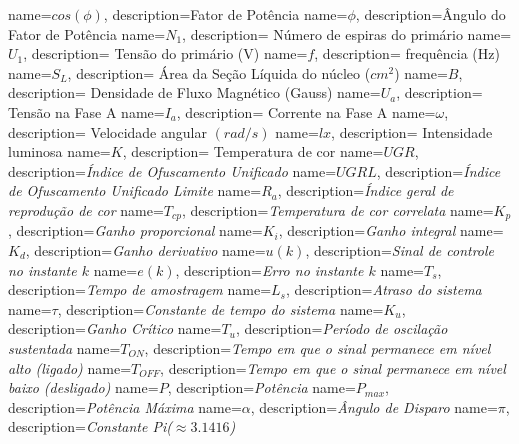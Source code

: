{
   name={$cos(\phi)$},
   description={Fator de Potência}
}
{
   name={$\phi$},
   description={Ângulo do Fator de Potência}
}
{
   name={$N_1$},
   description= Número de espiras do primário
}
{
   name={$U_1$},
   description= Tensão do primário (V)
}
{
   name={$f$},
   description= frequência (Hz)
}
{
   name={$S_L$},
   description= Área da Seção Líquida do núcleo ($cm^2$)
}
{
   name={$B$},
   description= Densidade de Fluxo Magnético (Gauss)
}
{
   name={$U_a$},
   description= Tensão na Fase A
}
{
   name={$I_a$},
   description= Corrente na Fase A
}
{
   name={$\omega$},
   description= Velocidade angular $(rad/s)$ 
}
{
   name={$lx$},
   description=  Intensidade luminosa
}
{
   name={$K$},
   description= Temperatura de cor
}
{
   name={$UGR$},
   description={\textit{Índice de Ofuscamento Unificado}}
}
{
   name={$UGRL$},
   description={\textit{Índice de Ofuscamento Unificado Limite}}
}
{
   name={$R_a$},
   description={\textit{Índice geral de reprodução de cor}}
}
{
   name={$T_{cp}$},
   description={\textit{Temperatura de cor correlata}}
}
{
   name={$K_{p}$},
   description={\textit{Ganho proporcional}}
}
{
   name={$K_{i}$},
   description={\textit{Ganho integral}}
}
{
   name={$K_{d}$},
   description={\textit{Ganho derivativo}}
}
{
   name={$u(k)$},
   description={\textit{Sinal de controle no instante $k$}}
}
{
   name={$e(k)$},
   description={\textit{Erro no instante $k$}}
}
{
   name={$T_{s}$},
   description={\textit{Tempo de amostragem}}
}
{
   name={$L_{s}$},
   description={\textit{Atraso do sistema}}
}
{
   name={$\tau$},
   description={\textit{Constante de tempo do sistema}}
}
{
   name={$K_{u}$},
   description={\textit{Ganho Crítico}}
}
{
   name={$T_{u}$},
   description={\textit{Período de oscilação sustentada}}
}
{
   name={$T_{ON}$},
   description={\textit{Tempo em que o sinal permanece em nível alto (ligado)}}
}
{
   name={$T_{OFF}$},
   description={\textit{Tempo em que o sinal permanece em nível baixo (desligado)}}
}
{
   name={$P$},
   description={\textit{Potência}}
}
{
   name={$P_{max}$},
   description={\textit{Potência Máxima}}
}
{
   name={$\alpha$},
   description={\textit{Ângulo de Disparo}}
}
{
   name={$\pi$},
   description={\textit{Constante Pi(\(\approx 3.1416\))}}
}
